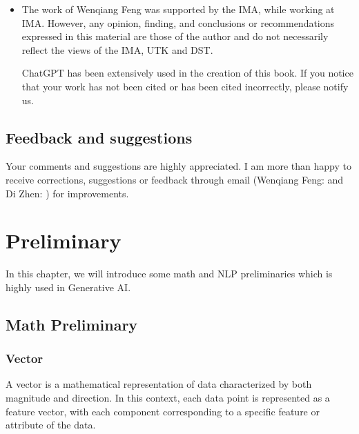\documentclass[letterpaper,11pt,english]{sphinxmanual}
\begin{document}
\begin{itemize}
\item {} 
\sphinxAtStartPar
{}

\sphinxAtStartPar
The work of Wenqiang Feng was supported by the IMA, while working at IMA. However, any opinion, finding,
and conclusions or recommendations expressed in this material are those of the author and do not necessarily
reflect the views of the IMA, UTK and DST.

\sphinxAtStartPar
ChatGPT has been extensively used in the creation of this book. If you notice that your work has not been
cited or has been cited incorrectly, please notify us.

\end{itemize}


\section{Feedback and suggestions}
\label{\detokenize{preface:feedback-and-suggestions}}
\sphinxAtStartPar
Your comments and suggestions are highly appreciated. I am more than happy to receive
corrections, suggestions or feedback through email (Wenqiang Feng:  and Di Zhen: 
) for improvements.

\sphinxstepscope


\chapter{Preliminary}
\label{\detokenize{prelim:preliminary}}\label{\detokenize{prelim:prelim}}\label{\detokenize{prelim::doc}}
\sphinxAtStartPar
In this chapter, we will introduce some math and NLP preliminaries which is highly
used in Generative AI.


\section{Math Preliminary}
\label{\detokenize{prelim:math-preliminary}}

\subsection{Vector}
\label{\detokenize{prelim:vector}}
\sphinxAtStartPar
A vector is a mathematical representation of data characterized by both magnitude and
direction. In this context, each data point is represented as a feature vector, with
each component corresponding to a specific feature or attribute of the data.
\end{document}
